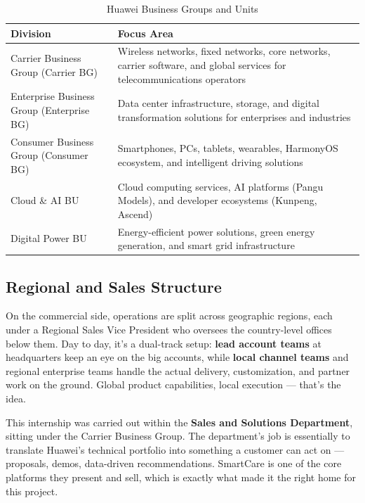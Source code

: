 \begin{table}[h!]
\centering
\renewcommand{\arraystretch}{1.4}
\begin{tabular}{|p{5.5cm}|p{8.5cm}|}
\hline
\textbf{Division} & \textbf{Focus Area} \\
\hline
Carrier Business Group (Carrier BG) & Wireless networks, fixed networks, core networks, 
carrier software, and global services for telecommunications operators \\
\hline
Enterprise Business Group (Enterprise BG) & Data center infrastructure, storage, and 
digital transformation solutions for enterprises and industries \\
\hline
Consumer Business Group (Consumer BG) & Smartphones, PCs, tablets, wearables, HarmonyOS 
ecosystem, and intelligent driving solutions \\
\hline
Cloud \& AI BU & Cloud computing services, AI platforms (Pangu Models), and developer 
ecosystems (Kunpeng, Ascend) \\
\hline
Digital Power BU & Energy-efficient power solutions, green energy generation, and smart 
grid infrastructure \\
\hline
\end{tabular}
\caption{Huawei Business Groups and Units}
\label{tab:huawei_org}
\end{table}

\subsection{Regional and Sales Structure}

On the commercial side, operations are split across geographic regions, each under a 
Regional Sales Vice President who oversees the country-level offices below them. Day 
to day, it's a dual-track setup: \textbf{lead account teams} at headquarters keep an 
eye on the big accounts, while \textbf{local channel teams} and regional enterprise 
teams handle the actual delivery, customization, and partner work on the ground. 
Global product capabilities, local execution --- that's the idea.

This internship was carried out within the \textbf{Sales and Solutions Department}, 
sitting under the Carrier Business Group. The department's job is essentially to 
translate Huawei's technical portfolio into something a customer can act on --- 
proposals, demos, data-driven recommendations. SmartCare is one of the core platforms 
they present and sell, which is exactly what made it the right home for this project.

